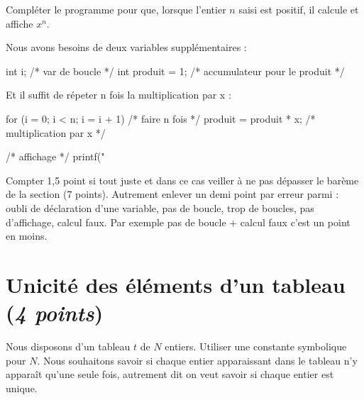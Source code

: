 \question Compléter le programme pour que, lorsque l'entier $n$
saisi est positif, il calcule et affiche $x^n$.

\begin{correction}
Nous avons besoins de deux variables supplémentaires :
  \begin{listing}{15}
  int i; /* var de boucle */
  int produit = 1; /* accumulateur pour le produit */ 
  \end{listing}

Et il suffit de répeter n fois la multiplication par x :
\begin{listing}{26}
  for (i  = 0; i < n; i = i + 1) /* faire n fois */
  {
    produit = produit * x; /* multiplication par x */
  }

  /* affichage */
  printf("%
\end{listing}

  \begin{baremeenv}
    Compter 1,5 point si tout juste et dans ce cas veiller à ne pas
    dépasser le barème de la section (7 points).  Autrement enlever un
    demi point par erreur parmi : oubli de déclaration d'une variable, pas de boucle, trop de boucles,
    pas d'affichage, calcul faux. Par exemple pas de boucle +
    calcul faux c'est un point en moins.
  \end{baremeenv}
\end{correction}
\section{Unicité des éléments d'un tableau (\emph{4 points})}

Nous disposons d'un tableau $t$ de $N$ entiers. Utiliser une constante
symbolique pour $N$. Nous souhaitons
savoir si chaque entier apparaissant dans le tableau n'y apparaît
qu'une seule fois, autrement dit on veut savoir si chaque entier
est unique.

